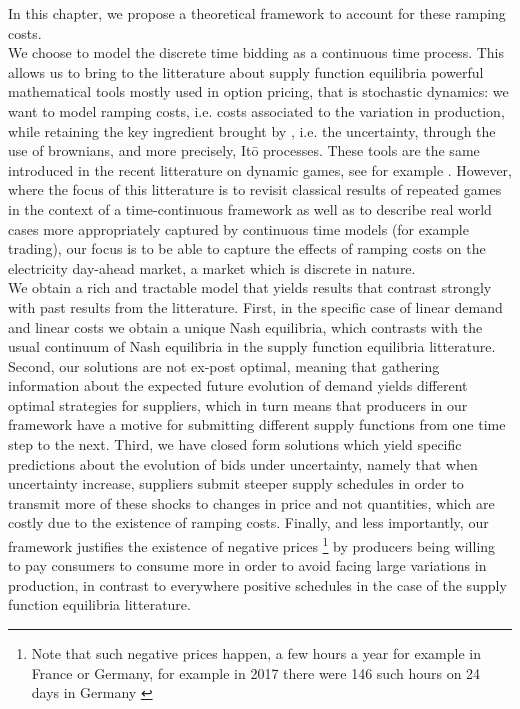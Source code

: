 In this chapter, we propose a theoretical framework to account for these ramping costs.\\

We choose to model the discrete time bidding as a continuous time process.  This allows us to bring to the litterature about supply function equilibria powerful mathematical tools mostly used in option pricing, that is stochastic dynamics: we want to model ramping costs, i.e. costs associated to the variation in production, while retaining the key ingredient brought by \cite{KM}, i.e. the uncertainty, through the use of brownians, and more precisely, It\={o} processes. These tools are the same introduced in the recent litterature on dynamic games, see for example \cite{sannikov2016dynamic}. However, where the focus of this litterature is to revisit classical results of repeated games in the context of a time-continuous framework as well as to describe real world cases more appropriately captured by continuous time models (for example trading), our focus is to be able to capture the effects of ramping costs on the electricity day-ahead market, a market which is discrete in nature.\\

We obtain a rich and tractable model that yields results that contrast strongly with past results from the litterature. First, in the specific case of linear demand and linear costs we obtain a unique Nash equilibria, which contrasts with the usual continuum of Nash equilibria in the supply function equilibria litterature. Second, our solutions are not ex-post optimal, meaning that gathering information about the expected future evolution of demand yields different optimal strategies for suppliers, which in turn means that producers in our framework have a motive for submitting different supply functions from one time step to the next. Third, we have closed form solutions which yield specific predictions about the evolution of bids under uncertainty, namely that when uncertainty increase, suppliers submit steeper supply schedules in order to transmit more of these shocks to changes in price and not quantities, which are costly due to the existence of ramping costs. Finally, and less importantly, our framework justifies the existence of negative prices \footnote{Note that such negative prices happen, a few hours a year for example in France or Germany, for example in 2017 there were 146 such hours on 24 days in Germany \cite{epexnegP}} by producers being willing to pay consumers to consume more in order to avoid facing large variations in production, in contrast to everywhere positive schedules in the case of the supply function equilibria litterature.\\

